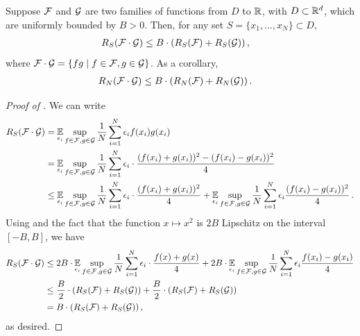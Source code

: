\begin{lemma} \label{lemma:product_rademacher_complexity}
Suppose $\mathcal{F}$ and $\mathcal{G}$ are two families of functions from $D$ to $\mathbb{R}$, with $D \subset \mathbb{R}^d$, which are uniformly bounded by $B > 0$. Then, for any set $S = \{x_1, \ldots, x_N\} \subset D$,
\begin{align}
{R_S}(\mathcal{F} \cdot \mathcal{G})
& \leq B \cdot ({R_S}(\mathcal{F}) + {R_S}(\mathcal{G})) \,,
\end{align}
where $\mathcal{F} \cdot \mathcal{G} = \{fg \mid f \in \mathcal{F}, g \in \mathcal{G}\}$. As a corollary,
\begin{align}
{R_N}(\mathcal{F} \cdot \mathcal{G})
& \leq B \cdot ({R_N}(\mathcal{F}) + {R_N}(\mathcal{G})) \,.
\end{align}
\end{lemma}
\begin{proof}[Proof of ]
We can write
\begin{align}
{R_S}(\mathcal{F} \cdot \mathcal{G})
& = \operatorname*{\mathbb{E}}_{\epsilon_i} \sup_{f \in \mathcal{F}, g \in \mathcal{G}} \frac{1}{N} \sum_{i = 1}^N \epsilon_i f(x_i) g(x_i) \\
& = \operatorname*{\mathbb{E}}_{\epsilon_i} \sup_{f \in \mathcal{F}, g \in \mathcal{G}} \frac{1}{N} \sum_{i = 1}^N \epsilon_i \cdot \frac{(f(x_i) + g(x_i))^2 - (f(x_i) - g(x_i))^2}{4} \\
& \leq \operatorname*{\mathbb{E}}_{\epsilon_i} \sup_{f \in \mathcal{F}, g \in \mathcal{G}} \frac{1}{N} \sum_{i = 1}^N \epsilon_i \cdot \frac{(f(x_i) + g(x_i))^2}{4} + \operatorname*{\mathbb{E}}_{\epsilon_i} \sup_{f \in \mathcal{F}, g \in \mathcal{G}} \frac{1}{N} \sum_{i = 1}^N \epsilon_i \frac{(f(x_i) - g(x_i))^2}{4} \,.
\end{align}
Using  and the fact that the function $x \mapsto x^2$ is $2B$ Lipschitz on the interval $[-B, B]$, we have
\begin{align}
{R_S}(\mathcal{F} \cdot \mathcal{G})
& \leq 2B \cdot \operatorname*{\mathbb{E}}_{\epsilon_i} \sup_{f \in \mathcal{F}, g \in \mathcal{G}} \frac{1}{N} \sum_{i = 1}^N \epsilon_i \cdot \frac{f(x) + g(x)}{4} + 2B \cdot \operatorname*{\mathbb{E}}_{\epsilon_i} \sup_{f \in \mathcal{F}, g \in \mathcal{G}} \frac{1}{N} \sum_{i = 1}^N \epsilon_i \frac{f(x_i) - g(x_i)}{4} \\
& \leq \frac{B}{2} \cdot ({R_S}(\mathcal{F}) + {R_S}(\mathcal{G})) + \frac{B}{2} \cdot ({R_S}(\mathcal{F}) + {R_S}(\mathcal{G})) \\
& = B \cdot ({R_S}(\mathcal{F}) + {R_S}(\mathcal{G})) \,,
\end{align}
as desired.
\end{proof}

